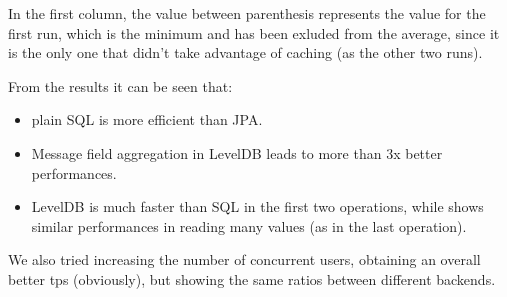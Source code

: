 \documentclass[10pt]{article}
\begin{document}
In the first column, the value between parenthesis represents the value 
for the first run, which is the minimum and has been exluded from the average, 
since it is the only one that didn't take advantage of caching (as the other two runs).

From the results it can be seen that:
\begin{itemize}
    \item plain SQL is more efficient than JPA.
    \item Message field aggregation in LevelDB leads to more than 3x better performances.
    \item LevelDB is much faster than SQL in the first two operations, while shows
            similar performances in reading many values (as in the last operation).
\end{itemize}

We also tried increasing the number of concurrent users, obtaining an overall 
better tps (obviously), but showing the same ratios between different backends.
\end{document}
